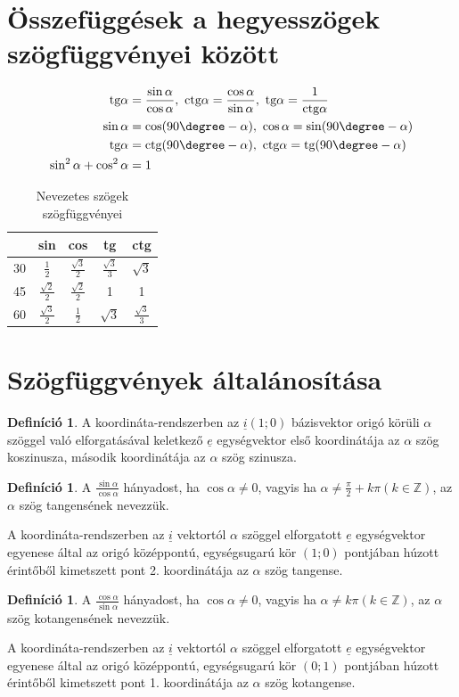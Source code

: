 \documentclass[twoside,12pt]{report}
\theoremstyle{definition}
\newtheorem{definition}[theorem]{Definíció}
\begin{document}
\section{Összefüggések a hegyesszögek szögfüggvényei között}
	\begin{align*}
		\text{tg}\alpha&=\frac{\sin\alpha}{\cos\alpha},\ \text{ctg}\alpha=\frac{\cos\alpha}{\sin\alpha},\ \text{tg}\alpha=\frac{1}{\text{ctg}\alpha}\\
		\sin\alpha&=\cos(90\degree-\alpha),\ \cos\alpha=\sin(90\degree-\alpha)\\
		\text{tg}\alpha&=\text{ctg}(90\degree-\alpha),\ \text{ctg}\alpha=\text{tg}(90\degree-\alpha)\\
		\sin^2\alpha+\cos^2\alpha&=1
	\end{align*}
	\begin{table}[H]
		\centering
		\begin{tabular}{|c||c|c|c|c|}
			\hline
			&sin&cos&tg&ctg\\\hline\hline
			30\degree&$\frac{1}{2}$&$\frac{\sqrt{3}}{2}$&$\frac{\sqrt{3}}{3}$&$\sqrt{3}$\\\hline
			45\degree&$\frac{\sqrt{2}}{2}$&$\frac{\sqrt{2}}{2}$&1&1\\\hline
			60\degree&$\frac{\sqrt{3}}{2}$&$\frac{1}{2}$&$\sqrt{3}$&$\frac{\sqrt{3}}{3}$\\\hline
		\end{tabular}
		\caption{Nevezetes szögek szögfüggvényei}
	\end{table}
\section{Szögfüggvények általánosítása}
	\begin{definition}
		A koordináta-rendszerben az $\underline{i}(1;0)$ bázisvektor origó körüli $\alpha$ szöggel való elforgatásával keletkező $\underline{e}$ egységvektor első koordinátája az $\alpha$ szög koszinusza, második koordinátája az $\alpha$ szög szinusza.
	\end{definition}
	\begin{definition}
		A $\frac{\sin\alpha}{\cos\alpha}$ hányadost, ha $\cos\alpha\ne0$, vagyis ha $\alpha\ne\frac{\pi}{2}+k\pi(k\in\mathbb{Z})$, az $\alpha$ szög tangensének nevezzük.
	\end{definition}
	A koordináta-rendszerben az $\underline{i}$ vektortól $\alpha$ szöggel elforgatott $\underline{e}$ egységvektor egyenese által az origó középpontú, egységsugarú kör $(1;0)$ pontjában húzott érintőből kimetszett pont 2. koordinátája az $\alpha$ szög tangense.
	\begin{definition}
		A $\frac{\cos\alpha}{\sin\alpha}$ hányadost, ha $\cos\alpha\ne0$, vagyis ha $\alpha\ne k\pi(k\in\mathbb{Z})$, az $\alpha$ szög kotangensének nevezzük.
	\end{definition}
	A koordináta-rendszerben az $\underline{i}$ vektortól $\alpha$ szöggel elforgatott $\underline{e}$ egységvektor egyenese által az origó középpontú, egységsugarú kör $(0;1)$ pontjában húzott érintőből kimetszett pont 1. koordinátája az $\alpha$ szög kotangense.
\end{document}
